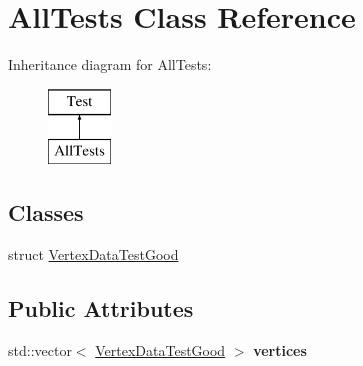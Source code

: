 \hypertarget{class_all_tests}{}\section{All\+Tests Class Reference}
\label{class_all_tests}
Inheritance diagram for All\+Tests\+:\begin{figure}[H]
\begin{center}
\leavevmode
\includegraphics[height=2.000000cm]{class_all_tests}
\end{center}
\end{figure}
\subsection*{Classes}
\begin{DoxyCompactItemize}
\item 
struct \mbox{\hyperlink{struct_all_tests_1_1_vertex_data_test_good}{Vertex\+Data\+Test\+Good}}
\end{DoxyCompactItemize}
\subsection*{Public Attributes}
\begin{DoxyCompactItemize}
\item 
std\+::vector$<$ \mbox{\hyperlink{struct_all_tests_1_1_vertex_data_test_good}{Vertex\+Data\+Test\+Good}} $>$ {\bfseries vertices}
\end{DoxyCompactItemize}
